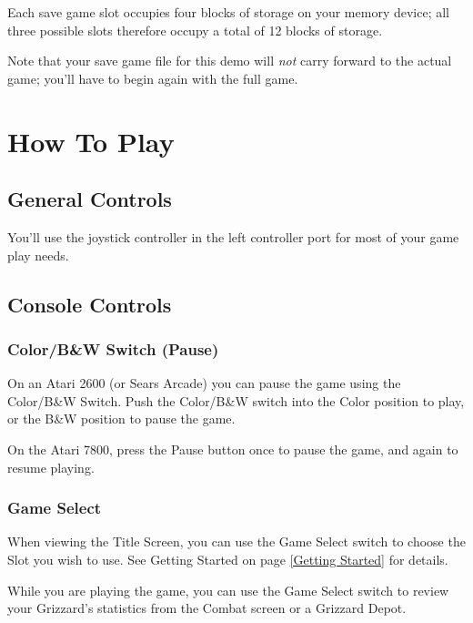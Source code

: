 \documentclass[12pt,openright,book]{memoir}
\begin{document}
Each  save game  slot occupies  four blocks  of storage  on your  memory
device; all three  possible slots therefore occupy a total  of 12 blocks
of storage.

\ifdefined\DEMO

Note  that your  save  game file  for this  demo  will \emph{not}  carry
forward  to  the actual  game;  you'll  have  to  begin again  with  the
full game.

\fi

\chapter{How To Play}

\section{General Controls}

You'll use the joystick controller in  the left controller port for most
of your game play needs.

\section{Console Controls}

\ifdefined\TVSECAM
\else

\subsection{Color/B\&W Switch (Pause)}

On an  Atari 2600  (or Sears Arcade)  you can pause  the game  using the
Color/B\&W Switch. Push the Color/B\&W switch into the Color position to
play, or the B\&W position to pause the game.

On the Atari  7800, press the Pause  button once to pause  the game, and
again to resume playing.

\fi

\subsection{Game Select}

When viewing  the Title Screen,  you can use  the Game Select  switch to
choose  the  Slot  you  wish  to   use.  See  Getting  Started  on  page
\ref{Getting Started} for details.

While you are  playing the game, you  can use the Game  Select switch to
review   your  Grizzard's   statistics   from  the   Combat  screen   or
a Grizzard Depot.
\end{document}

